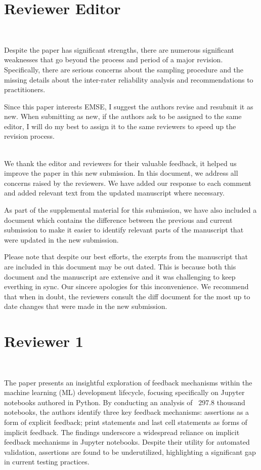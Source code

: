 \documentclass[11pt,fleqn]{article}
\title{\vspace*{-2cm}{\bf Authors' Response to the Review of
 EMSE-D-24-00354:\\
 ``Understanding Feedback Mechanisms in Machine Learning Jupyter Notebooks''}}
\author{Arumoy Shome, Lu\'{i}s Cruz, Diomidis Spinellis, Arie van Deursen}
\date{}
\newcommand{\eline}{\vspace*{.75\baselineskip}}
\newcommand{\Referee}[1]{\eline \noindent {\bf Reviewer comment #1:} \\}
\newcommand{\Us}{\eline \noindent {\bf Response:}\\}
\newcommand{\newreviewer}[1]{\section*{Reviewer #1}\vspace*{-1.05\baselineskip}}
\newenvironment{revcomment}[1][]
{\Referee{#1}\begin{rcomment}}
{\end{rcomment}}
\begin{document}
\maketitle

\newreviewer{Editor}

\begin{revcomment}

  Despite the paper has significant strengths, there are numerous significant weaknesses that go beyond the process and period of a major revision. Specifically, there are serious concerns about the sampling procedure and the missing details about the inter-rater reliability analysis and recommendations to practitioners.

  Since this paper interests EMSE, I suggest the authors revise and resubmit it as new. When submitting as new, if the authors ask to be assigned to the same editor, I will do my best to assign it to the same reviewers to speed up the revision process.

\end{revcomment}

\Us We thank the editor and reviewers for their valuable feedback, it helped us improve the paper in this new submission. In this document, we address all concerns raised by the reviewers. We have added our response to each comment and added relevant text from the updated manuscript where necessary.

As part of the supplemental material for this submission, we have also included a document which contains the difference between the previous and current submission to make it easier to identify relevant parts of the manuscript that were updated in the new submission.

Please note that despite our best efforts, the exerpts from the manuscript that are included in this document may be out dated. This is because both this document and the manuscript are extensive and it was challenging to keep everthing in sync. Our sincere apologies for this inconvenience. We recommend that when in doubt, the reviewers consult the diff document for the most up to date changes that were made in the new submission.

\newreviewer{1}

\begin{revcomment}[1.1]
  The paper presents an insightful exploration of feedback mechanisms within the machine learning (ML) development lifecycle, focusing specifically on Jupyter notebooks authored in Python. By conducting an analysis of ~297.8 thousand notebooks, the authors identify three key feedback mechanisms: assertions as a form of explicit feedback; print statements and last cell statements as forms of implicit feedback. The findings underscore a widespread reliance on implicit feedback mechanisms in Jupyter notebooks. Despite their utility for automated validation, assertions are found to be underutilized, highlighting a significant gap in current testing practices.

\end{revcomment}
\end{document}
